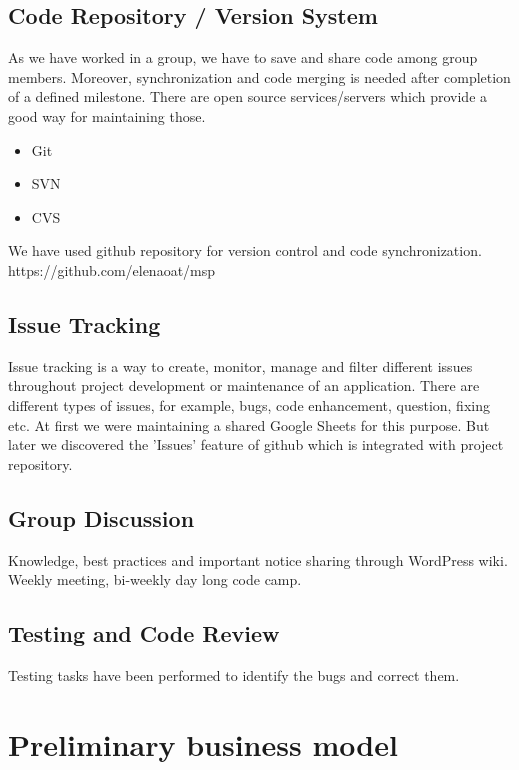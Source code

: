 \documentclass[10pt,a4paper]{report}
\begin{document}
\section{Code Repository / Version System}



As we have worked in a group, we have to save and share code among group members. Moreover, synchronization and code merging is needed after completion of a defined milestone. There are open source services/servers which provide a good way for maintaining those.

\begin{itemize}
	\item Git
	\item SVN
	\item CVS
\end{itemize}

We have used github repository for version control and code synchronization. https://github.com/elenaoat/msp

\section{Issue Tracking}


Issue tracking is a way to create, monitor, manage and filter different issues throughout project development or maintenance of an application. There are different types of issues, for example, bugs, code enhancement, question, fixing etc. At first we were maintaining a shared Google Sheets for this purpose. But later we discovered the 'Issues' feature of github which is integrated with project repository.

\section{Group Discussion}


Knowledge, best practices and important notice sharing through WordPress wiki. Weekly meeting, bi-weekly day long code camp.

\section{Testing and Code Review}
Testing tasks have been performed to identify the bugs and correct them.


\chapter{Preliminary business model}
\end{document}
